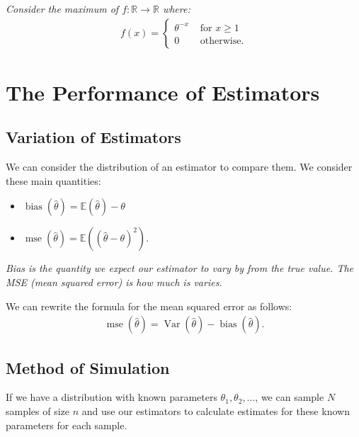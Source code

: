 \documentclass[a4paper, 12pt, twoside]{article}
\DeclareMathOperator{\Mse}{mse}
\DeclareMathOperator{\Bias}{bias}
\DeclareMathOperator{\Var}{Var}
\begin{document}
\textit{Consider the maximum of $f:\mathbb{R} \to \mathbb{R}$ where:}
\begin{align*}
    f(x) = \begin{cases}
        \theta^{-x} & \text{ for } x \geq 1 \\
        0           & \text{ otherwise.}
    \end{cases}
\end{align*}

\section{The Performance of Estimators}

\subsection{Variation of Estimators}

We can consider the distribution of an estimator to compare them. We
consider these main quantities:

\begin{itemize}
    \item $\Bias(\hat\theta) = \mathbb{E}(\hat\theta) - \theta$
    \item $\Mse(\hat\theta) = \mathbb{E}((\hat\theta - \theta)^2)$.
\end{itemize}

\textit{Bias is the quantity we expect our estimator to vary by from
    the true value. The MSE (mean squared error) is how much is varies.}

\vspace{\baselineskip}

We can rewrite the formula for the mean squared error as follows:
\begin{align*}
    \Mse(\hat\theta) = \Var(\hat\theta) - \Bias(\hat\theta).
\end{align*}

\subsection{Method of Simulation}

If we have a distribution with known parameters $\theta_1, \theta_2,
    \ldots$, we can sample $N$ samples of size $n$ and use our estimators
to calculate estimates for these known parameters for each sample.

\vspace{\baselineskip}
\end{document}

